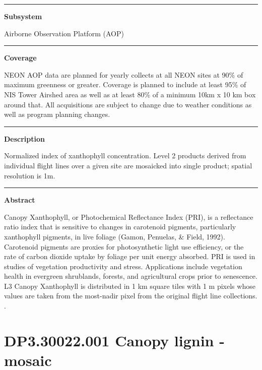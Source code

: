 \documentclass[]{article}
\begin{document}
\begin{center}\rule{0.5\linewidth}{\linethickness}\end{center}

\textbf{Subsystem}

Airborne Observation Platform (AOP)

\begin{center}\rule{0.5\linewidth}{\linethickness}\end{center}

\textbf{Coverage}

NEON AOP data are planned for yearly collects at all NEON sites at 90\%
of maximum greenness or greater. Coverage is planned to include at least
95\% of NIS Tower Airshed area as well as at least 80\% of a minimum
10km x 10 km box around that. All acquisitions are subject to change due
to weather conditions as well as program planning changes.

\begin{center}\rule{0.5\linewidth}{\linethickness}\end{center}

\textbf{Description}

Normalized index of xanthophyll concentration. Level 2 products derived
from individual flight lines over a given site are mosaicked into single
product; spatial resolution is 1m.

\begin{center}\rule{0.5\linewidth}{\linethickness}\end{center}

\textbf{Abstract}

Canopy Xanthophyll, or Photochemical Reflectance Index (PRI), is a
reflectance ratio index that is sensitive to changes in carotenoid
pigments, particularly xanthophyll pigments, in live foliage (Gamon,
Penuelas, \& Field, 1992). Carotenoid pigments are proxies for
photosynthetic light use efficiency, or the rate of carbon dioxide
uptake by foliage per unit energy absorbed. PRI is used in studies of
vegetation productivity and stress. Applications include vegetation
health in evergreen shrublands, forests, and agricultural crops prior to
senescence. L3 Canopy Xanthophyll is distributed in 1 km square tiles
with 1 m pixels whose values are taken from the most-nadir pixel from
the original flight line collections. \newpage
.

\section{DP3.30022.001 Canopy lignin -
mosaic}\label{dp3.30022.001-canopy-lignin---mosaic}
\end{document}
